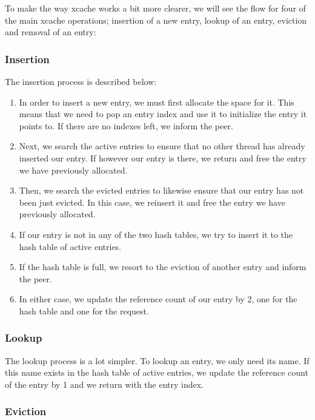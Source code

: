 To make the way xcache works a bit more clearer, we will see the flow for four 
of the main xcache operations; insertion of a new entry, lookup of an entry, 
eviction and removal of an entry:

\subsubsection{Insertion}

The insertion process is described below:

\begin{enumerate}
	\item In order to insert a new entry, we must first allocate the space 
		for it. This means that we need to pop an entry index and use 
		it to initialize the entry it points to. If there are no 
		indexes left, we inform the peer.
	\item Next, we search the active entries to ensure that no other thread 
		has already inserted our entry. If however our entry is there, 
		we return and free the entry we have previously allocated.
	\item Then, we search the evicted entries to likewise ensure that our entry 
		has not been just evicted. In this case, we reinsert it and free the 
		entry we have previously allocated.
	\item If our entry is not in any of the two hash tables, we try to insert 
		it to the hash table of active entries.
	\item If the hash table is full, we resort to the eviction of another 
		entry and inform the peer.
	\item In either case, we update the reference count of our entry by 2, 
		one for the hash table and one for the request.
\end{enumerate}

\subsubsection{Lookup}

The lookup process is a lot simpler. To lookup an entry, we only need its name.  
If this name exists in the hash table of active entries, we update the 
reference count of the entry by 1 and we return with the entry index.

\subsubsection{Eviction}

